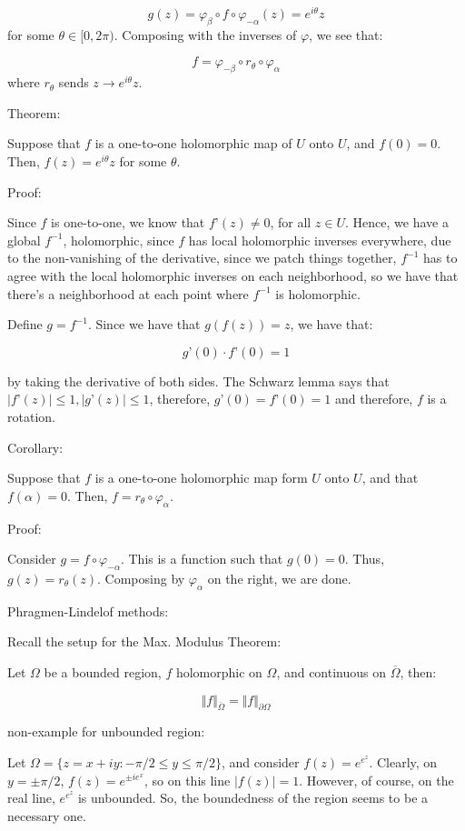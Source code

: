 \documentclass[10pt]{article}
\begin{document}
$$g(z)  = \varphi_\beta \circ f \circ \varphi_{-\alpha}(z) = e^{i\theta} z$$ for some $\theta \in [0,2\pi)$. Composing with the inverses of $\varphi$, we see that:

$$ f = \varphi_{-\beta} \circ r_\theta \circ \varphi_\alpha$$ where $r_\theta$ sends $z \to e^{i\theta} z$.

Theorem:

Suppose that $f$ is a one-to-one holomorphic map of $U$ onto $U$, and $f(0) = 0$. Then, $f(z) = e^{i\theta}z$ for some $\theta$.

Proof:

Since $f$ is one-to-one, we know that $f’(z) \not = 0$, for all $z \in U$. Hence, we have a global $f^{-1}$, holomorphic, since $f$ has local holomorphic inverses everywhere, due to the non-vanishing of the derivative, since we patch things together, $f^{-1}$ has to agree with the local holomorphic inverses on each neighborhood, so we have that there’s a neighborhood at each point where $f^{-1}$ is holomorphic.

Define $g = f^{-1}$. Since we have that $g(f(z)) = z$, we have that:

$$g’(0) \cdot f’(0) = 1 $$

by taking the derivative of both sides. The Schwarz lemma says that $|f’(z)| \leq 1, |g’(z)| \leq 1$, therefore, $g’(0) = f’(0) = 1$ and therefore, $f$ is a rotation.

Corollary:

Suppose that $f$ is a one-to-one holomorphic map form $U$ onto $U$, and that $f(\alpha) = 0$. Then, $f = r_\theta \circ \varphi_\alpha$.

Proof:

Consider $g = f \circ \varphi_{-\alpha}$. This is a function such that $g(0) = 0$. Thus, $g(z) = r_\theta(z)$. Composing by $\varphi_{\alpha}$ on the right, we are done.

Phragmen-Lindelof methods:

Recall the setup for the Max. Modulus Theorem:

Let $\Omega$ be a bounded region, $f$ holomorphic on $\Omega$, and continuous on $\overline{\Omega}$, then:

$$ \Vert f \Vert_{\overline{\Omega}} = \Vert f \Vert_{\partial \Omega} $$

non-example for unbounded region:

Let $\Omega = \{ z = x + iy : -\pi/2 \leq y \leq \pi/2 \}$, and consider $f(z) = e^{e^{z}}$. Clearly, on $y = \pm\pi/2$, $f(z) = e^{\pm i e^{x}}$, so on this line $|f(z)| = 1$. However, of course, on the real line, $e^{e^{z}}$ is unbounded. So, the boundedness of the region seems to be a necessary one. 
\end{document}
